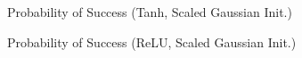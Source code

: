 \begin{figure}
\centering
\newcommand{\myWidth}{0.4\textwidth}
\newcommand{\myspace}{\hspace{3mm}}
\begin{subfigure}{\myWidth}
  \centering
  \caption{Probability of Success (Tanh, Scaled Gaussian Init.)}
  \label{fig:mnist_sim_s1}
\end{subfigure}\myspace%
\begin{subfigure}{\myWidth}
  \centering
  \caption{Probability of Success (ReLU, Scaled Gaussian Init.)}
  \label{fig:mnist_sim_s2}
\end{subfigure}\myspace
\begin{subfigure}{8mm}

\end{subfigure}
\end{figure}
